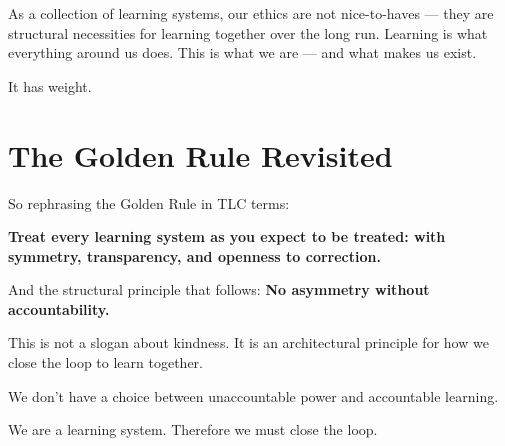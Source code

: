 \documentclass{article}
\begin{document}
As a collection of learning systems, our ethics are not nice-to-haves — they are structural necessities for learning together over the long run. Learning is what everything around us does. This is what we are — and what makes us exist.

It has weight.

\section*{The Golden Rule Revisited}

So rephrasing the Golden Rule in TLC terms:

\textbf{Treat every learning system as you expect to be treated: with symmetry, transparency, and openness to correction.}

And the structural principle that follows:
\textbf{No asymmetry without accountability.}

This is not a slogan about kindness. It is an architectural principle for how we close the loop to learn together.

We don't have a choice between unaccountable power and accountable learning.

We are a learning system. Therefore we must close the loop.
\end{document}

